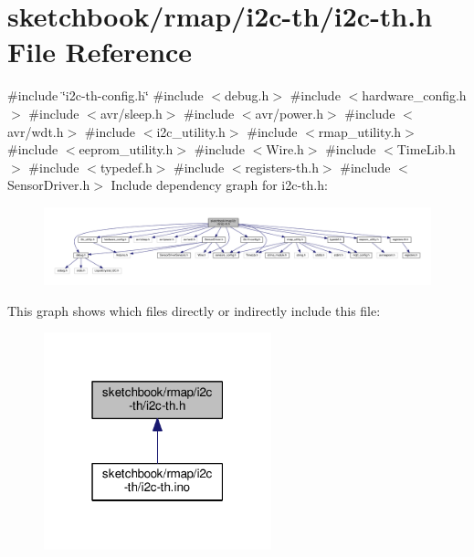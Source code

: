 \hypertarget{i2c-th_8h}{}\section{sketchbook/rmap/i2c-\/th/i2c-\/th.h File Reference}
\label{i2c-th_8h}
{\ttfamily \#include \char`\"{}i2c-\/th-\/config.\+h\char`\"{}}\newline
{\ttfamily \#include $<$debug.\+h$>$}\newline
{\ttfamily \#include $<$hardware\+\_\+config.\+h$>$}\newline
{\ttfamily \#include $<$avr/sleep.\+h$>$}\newline
{\ttfamily \#include $<$avr/power.\+h$>$}\newline
{\ttfamily \#include $<$avr/wdt.\+h$>$}\newline
{\ttfamily \#include $<$i2c\+\_\+utility.\+h$>$}\newline
{\ttfamily \#include $<$rmap\+\_\+utility.\+h$>$}\newline
{\ttfamily \#include $<$eeprom\+\_\+utility.\+h$>$}\newline
{\ttfamily \#include $<$Wire.\+h$>$}\newline
{\ttfamily \#include $<$Time\+Lib.\+h$>$}\newline
{\ttfamily \#include $<$typedef.\+h$>$}\newline
{\ttfamily \#include $<$registers-\/th.\+h$>$}\newline
{\ttfamily \#include $<$Sensor\+Driver.\+h$>$}\newline
Include dependency graph for i2c-\/th.h\+:\nopagebreak
\begin{figure}[H]
\begin{center}
\leavevmode
\includegraphics[width=350pt]{i2c-th_8h__incl}
\end{center}
\end{figure}
This graph shows which files directly or indirectly include this file\+:\nopagebreak
\begin{figure}[H]
\begin{center}
\leavevmode
\includegraphics[width=187pt]{i2c-th_8h__dep__incl}
\end{center}
\end{figure}
